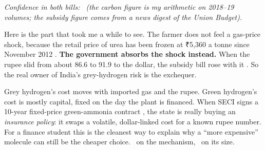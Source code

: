 \begin{center}
\end{center}
{\small\itshape\color{ink2} Confidence in both bills: \confM\ (the carbon figure is my arithmetic on 2018–19 volumes; the subsidy figure comes from a news digest of the Union Budget).}

Here is the part that took me a while to see. The farmer does not feel a gas-price shock, because the retail price of urea has been frozen at ₹5,360 a tonne since November 2012 \cite{skfert2026}. \textbf{The government absorbs the shock instead.} When the rupee slid from about 86.6 to 91.9 to the dollar, the subsidy bill rose with it \cite{skfert2026}. So the real owner of India's grey-hydrogen risk is the exchequer.

\begin{finding}
Grey hydrogen's cost moves with imported gas and the rupee. Green hydrogen's cost is mostly capital, fixed on the day the plant is financed. When SECI signs a 10-year fixed-price green-ammonia contract \cite{pvm2025}, the state is really buying an \emph{insurance policy}: it swaps a volatile, dollar-linked cost for a known rupee number. For a finance student this is the cleanest way to explain why a ``more expensive'' molecule can still be the cheaper choice. \confH\ on the mechanism, \confM\ on its size.
\end{finding}

